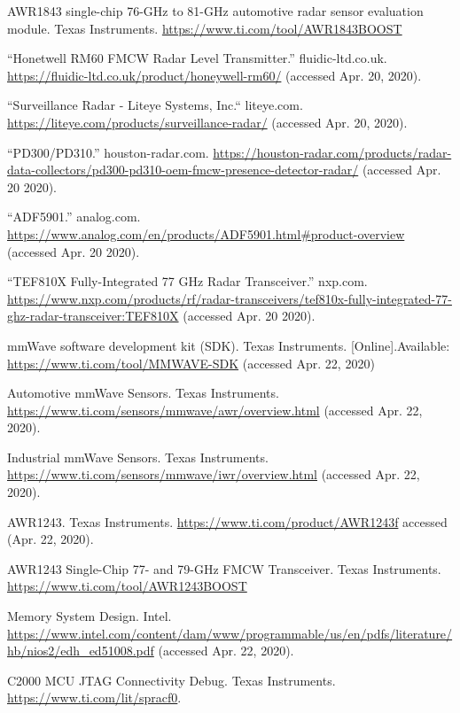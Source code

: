 \documentclass[11pt]{IEEEtran}
\begin{document}
\begin{thebibliography}{00}
				 AWR1843 single-chip 76-GHz to 81-GHz automotive radar sensor evaluation module. Texas Instruments. \url{https://www.ti.com/tool/AWR1843BOOST}

				 ``Honetwell RM60 FMCW Radar Level Transmitter.'' fluidic-ltd.co.uk. \url{https://fluidic-ltd.co.uk/product/honeywell-rm60/} (accessed Apr. 20, 2020).

				 ``Surveillance Radar - Liteye Systems, Inc.`` liteye.com. \url{https://liteye.com/products/surveillance-radar/} (accessed Apr. 20, 2020).

				 ``PD300/PD310.'' houston-radar.com. \url{https://houston-radar.com/products/radar-data-collectors/pd300-pd310-oem-fmcw-presence-detector-radar/} (accessed Apr. 20 2020).

				 ``ADF5901.'' analog.com. \url{https://www.analog.com/en/products/ADF5901.html#product-overview} (accessed Apr. 20 2020).
				
				 ``TEF810X Fully-Integrated 77 GHz Radar Transceiver.'' nxp.com. \url{https://www.nxp.com/products/rf/radar-transceivers/tef810x-fully-integrated-77-ghz-radar-transceiver:TEF810X} (accessed Apr. 20 2020).

				 mmWave software development kit (SDK). Texas Instruments. [Online].Available: \url{https://www.ti.com/tool/MMWAVE-SDK} (accessed Apr. 22, 2020)

				 Automotive mmWave Sensors. Texas Instruments. \url{https://www.ti.com/sensors/mmwave/awr/overview.html} (accessed Apr. 22, 2020).

				 Industrial mmWave Sensors. Texas Instruments. \url{https://www.ti.com/sensors/mmwave/iwr/overview.html} (accessed Apr. 22, 2020).

				 AWR1243. Texas Instruments. \url{https://www.ti.com/product/AWR1243f} accessed (Apr. 22, 2020).

				 AWR1243 Single-Chip 77- and 79-GHz FMCW Transceiver. Texas Instruments. \url{https://www.ti.com/tool/AWR1243BOOST}

				 Memory System Design. Intel. \url{https://www.intel.com/content/dam/www/programmable/us/en/pdfs/literature/hb/nios2/edh_ed51008.pdf} (accessed Apr. 22, 2020).

				 C2000 MCU JTAG Connectivity Debug. Texas Instruments. \url{https://www.ti.com/lit/spracf0}.


\end{thebibliography}
\end{document}
